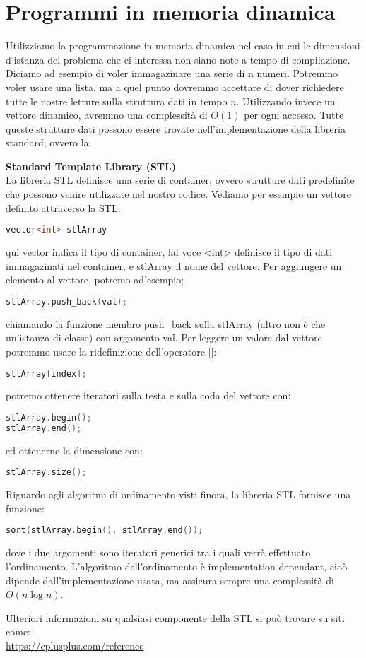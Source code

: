\documentclass[a4paper,12pt]{article}
\begin{document}
\section{Programmi in memoria dinamica}
Utilizziamo la programmazione in memoria dinamica nel caso in cui le dimensioni d'istanza del problema che ci interessa
non siano note a tempo di compilazione. Diciamo ad esempio di voler immagazinare una serie di n numeri. Potremmo
voler usare una lista, ma a quel punto dovremmo accettare di dover richiedere tutte le nostre letture sulla struttura dati
in tempo $n$. Utilizzando invece un vettore dinamico, avremmo una complessità di $O(1)$ per ogni accesso. Tutte queste strutture
dati possono essere trovate nell'implementazione della libreria standard, ovvero la:
\par\smallskip
\textbf{Standard Template Library (STL)} \\
La libreria STL definisce una serie di container, ovvero strutture dati predefinite che possono venire utilizzate
nel nostro codice. Vediamo per esempio un vettore definito attraverso la STL:
\begin{lstlisting}[language=C++]
vector<int> stlArray
\end{lstlisting}
qui vector indica il tipo di container, lal voce <int> definisce il tipo di dati immagazinati nel container, 
e stlArray il nome del vettore. Per aggiungere un elemento al vettore, potremo ad'esempio;
\begin{lstlisting}[language=C++]
stlArray.push_back(val);
\end{lstlisting}
chiamando la funzione membro push\_back sulla stlArray (altro non è che un'istanza di classe) con argomento val.
Per leggere un valore dal vettore potremmo usare la ridefinizione dell'operatore []:
\begin{lstlisting}[language=C++]
stlArray[index];
\end{lstlisting}
potremo ottenere iteratori sulla testa e sulla coda del vettore con:
\begin{lstlisting}[language=C++]
stlArray.begin();
stlArray.end();
\end{lstlisting}
ed ottenerne la dimensione con:
\begin{lstlisting}[language=C++]
stlArray.size();
\end{lstlisting}

Riguardo agli algoritmi di ordinamento visti finora, la libreria STL fornisce una funzione:
\begin{lstlisting}[language=C++]
sort(stlArray.begin(), stlArray.end());
\end{lstlisting}
dove i due argomenti sono iteratori generici tra i quali verrà effettuato l'ordinamento. L'algoritmo
dell'ordinamento è implementation-dependant, cioò dipende dall'implementazione usata, ma assicura 
sempre una complessità di $O(n\log{n})$.
\par\smallskip
Ulteriori informazioni su qualsiasi componente della STL si può trovare su siti come: \\
\url{https://cplusplus.com/reference} \\
\end{document}
